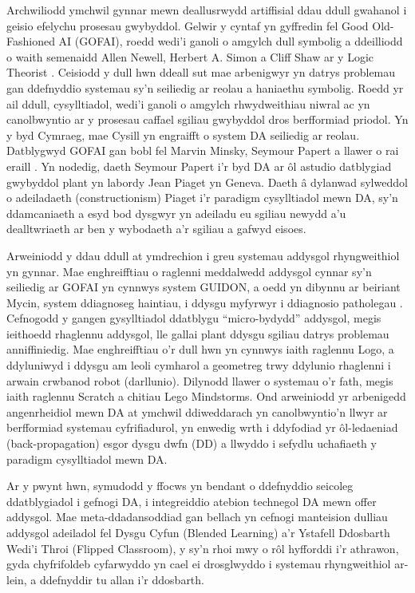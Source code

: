 Archwiliodd ymchwil gynnar mewn deallusrwydd artiffisial ddau ddull gwahanol i geisio efelychu prosesau gwybyddol. Gelwir y cyntaf yn gyffredin fel Good Old-Fashioned AI (GOFAI), roedd wedi'i ganoli o amgylch dull symbolig a ddeilliodd o waith semenaidd Allen Newell, Herbert A. Simon a Cliff Shaw ar y Logic Theorist \parencite{newell_logic_1956}. Ceisiodd y dull hwn ddeall sut mae arbenigwyr yn datrys problemau gan ddefnyddio systemau sy'n seiliedig ar reolau a haniaethu symbolig. Roedd yr ail ddull, cysylltiadol, wedi'i ganoli o amgylch rhwydweithiau niwral ac yn canolbwyntio ar y prosesau caffael sgiliau gwybyddol dros berfformiad priodol. Yn y byd Cymraeg, mae Cysill \parencite{hicks_welsh_2004} yn engraifft o system DA seiliedig ar reolau. Datblygwyd GOFAI gan bobl fel Marvin Minsky, Seymour Papert a llawer o rai eraill \parencite{doroudi_intertwined_2023}. Yn nodedig, daeth Seymour Papert i'r byd DA ar ôl astudio datblygiad gwybyddol plant yn labordy Jean Piaget yn Geneva. Daeth â dylanwad sylweddol o adeiladaeth (constructionism) Piaget i'r paradigm cysylltiadol mewn DA, sy'n ddamcaniaeth a esyd bod dysgwyr yn adeiladu eu sgiliau newydd a'u dealltwriaeth ar ben y wybodaeth a'r sgiliau a gafwyd eisoes.

Arweiniodd y ddau ddull at ymdrechion i greu systemau addysgol rhyngweithiol yn gynnar. Mae enghreifftiau o raglenni meddalwedd addysgol cynnar sy'n seiliedig ar GOFAI yn cynnwys system GUIDON, a oedd yn dibynnu ar beiriant Mycin, system ddiagnoseg haintiau, i ddysgu myfyrwyr i ddiagnosio patholegau \parencite{william_j_guidon_1983}. Cefnogodd y gangen gysylltiadol ddatblygu ``micro-bydydd'' addysgol, megis ieithoedd rhaglennu addysgol, lle gallai plant ddysgu sgiliau datrys problemau anniffiniedig. Mae enghreifftiau o'r dull hwn yn cynnwys iaith raglennu Logo, a ddyluniwyd i ddysgu am leoli cymharol a geometreg trwy ddylunio rhaglenni i arwain crwbanod robot (darllunio). Dilynodd llawer o systemau o'r fath, megis iaith raglennu Scratch a chitiau Lego Mindstorms. Ond arweiniodd yr arbenigedd angenrheidiol mewn DA at ymchwil ddiweddarach yn canolbwyntio'n llwyr ar berfformiad systemau cyfrifiadurol, yn enwedig wrth i ddyfodiad yr ôl-ledaeniad (back-propagation) esgor dysgu dwfn (DD) a llwyddo i sefydlu uchafiaeth y paradigm cysylltiadol mewn DA\@.

Ar y pwynt hwn, symudodd y ffocws yn bendant o ddefnyddio seicoleg ddatblygiadol i gefnogi DA, i integreiddio atebion technegol DA mewn offer addysgol. Mae meta-ddadansoddiad gan \textcite{schmid_meta-analysis_2023} bellach yn cefnogi manteision dulliau addysgol adeiladol fel Dysgu Cyfun (Blended Learning) a'r Ystafell Ddosbarth Wedi'i Throi (Flipped Classroom), y sy'n rhoi mwy o rôl hyfforddi i'r athrawon, gyda chyfrifoldeb cyfarwyddo yn cael ei drosglwyddo i systemau rhyngweithiol ar-lein, a ddefnyddir tu allan i'r ddosbarth.

